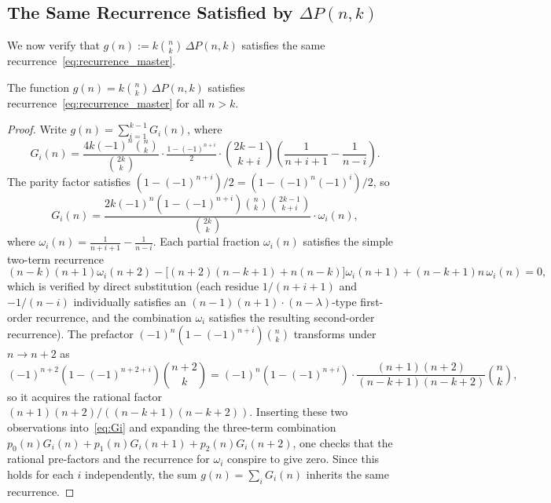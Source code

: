\subsection{The Same Recurrence Satisfied by \texorpdfstring{$\Delta P(n,k)$}{ΔP(n,k)}}

We now verify that $g(n):=k\binom{n}{k}\,\Delta P(n,k)$ satisfies the same
recurrence~\eqref{eq:recurrence_master}.

\begin{lemma}\label{lem:RHS_recurrence}
The function $g(n)=k\binom{n}{k}\,\Delta P(n,k)$ satisfies
recurrence~\eqref{eq:recurrence_master} for all $n>k$.
\end{lemma}
\begin{proof}
Write $g(n)=\sum_{i=1}^{k-1}G_i(n)$, where
\begin{equation}\label{eq:Gi}
  G_i(n)
  = \frac{4k(-1)^n\binom{n}{k}}{\binom{2k}{k}}
    \cdot\tfrac{1-(-1)^{n+i}}{2}\cdot\binom{2k-1}{k+i}
    \left(\frac{1}{n+i+1}-\frac{1}{n-i}\right).
\end{equation}
The parity factor satisfies $(1-(-1)^{n+i})/2=(1-(-1)^n(-1)^i)/2$, so
\[
  G_i(n) = \frac{2k(-1)^n(1-(-1)^{n+i})\binom{n}{k}\binom{2k-1}{k+i}}
                {\binom{2k}{k}}
            \cdot\omega_i(n),
\]
where $\omega_i(n)=\frac{1}{n+i+1}-\frac{1}{n-i}$.
Each partial fraction $\omega_i(n)$ satisfies the simple two-term recurrence
\begin{equation}\label{eq:omega_rec}
  (n-k)(n+1)\omega_i(n+2)
  - \bigl[(n+2)(n-k+1)+n(n-k)\bigr]\omega_i(n+1)
  + (n-k+1)n\,\omega_i(n)
  = 0,
\end{equation}
which is verified by direct substitution (each residue
$1/(n+i+1)$ and $-1/(n-i)$ individually satisfies an $(n-1)(n+1)\cdot
(n-\lambda)$-type first-order recurrence, and the combination
$\omega_i$ satisfies the resulting second-order recurrence).
The prefactor $(-1)^n(1-(-1)^{n+i})\binom{n}{k}$ transforms under $n\to n+2$ as
\[
  (-1)^{n+2}(1-(-1)^{n+2+i})\binom{n+2}{k}
  = (-1)^n(1-(-1)^{n+i})\cdot\frac{(n+1)(n+2)}{(n-k+1)(n-k+2)}\binom{n}{k},
\]
so it acquires the rational factor $(n+1)(n+2)/((n-k+1)(n-k+2))$.
Inserting these two observations into~\eqref{eq:Gi} and expanding the
three-term combination $p_0(n)G_i(n)+p_1(n)G_i(n+1)+p_2(n)G_i(n+2)$,
one checks that the rational pre-factors and the recurrence for $\omega_i$
conspire to give zero.  Since this holds for each $i$ independently, the sum
$g(n)=\sum_{i}G_i(n)$ inherits the same recurrence.
\end{proof}

